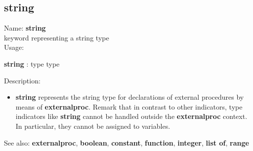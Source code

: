 \subsection{ string }
\noindent Name: \textbf{string}\\
keyword representing a \textsf{string} type \\

\noindent Usage: 
\begin{center}
\textbf{string} : \textsf{type type}\\
\end{center}
\noindent Description: \begin{itemize}

\item \textbf{string} represents the \textsf{string} type for declarations
   of external procedures by means of \textbf{externalproc}.
   Remark that in contrast to other indicators, type indicators like
   \textbf{string} cannot be handled outside the \textbf{externalproc} context.  In
   particular, they cannot be assigned to variables.
\end{itemize}
See also: \textbf{externalproc}, \textbf{boolean}, \textbf{constant}, \textbf{function}, \textbf{integer}, \textbf{list of}, \textbf{range}
